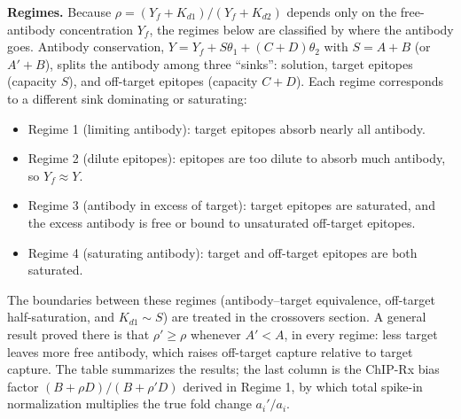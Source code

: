 \documentclass[11pt]{article}
\begin{document}
\textbf{Regimes.} Because $\rho=(Y_f+K_{d1})/(Y_f+K_{d2})$ depends only on
the free-antibody concentration $Y_f$, the regimes below are classified by
where the antibody goes. Antibody conservation,
$Y=Y_f+S\theta_1+(C+D)\theta_2$ with $S=A+B$ (or $A'+B$), splits the
antibody among three ``sinks'': solution, target epitopes (capacity $S$),
and off-target epitopes (capacity $C+D$). Each regime corresponds to a
different sink dominating or saturating:
\begin{itemize}
    \item Regime 1 (limiting antibody): target epitopes absorb nearly all
    antibody.
    \item Regime 2 (dilute epitopes): epitopes are too dilute to absorb
    much antibody, so $Y_f\approx Y$.
    \item Regime 3 (antibody in excess of target): target epitopes are
    saturated, and the excess antibody is free or bound to unsaturated
    off-target epitopes.
    \item Regime 4 (saturating antibody): target and off-target epitopes
    are both saturated.
\end{itemize}
The boundaries between these regimes (antibody--target equivalence,
off-target half-saturation, and $K_{d1}\sim S$) are treated in the
crossovers section. A general result proved there is that
$\rho'\ge\rho$ whenever $A'<A$, in every regime: less target leaves more
free antibody, which raises off-target capture relative to target capture.
The table summarizes the results; the last column is the ChIP-Rx bias
factor $(B+\rho D)/(B+\rho'D)$ derived in Regime 1, by which total
spike-in normalization multiplies the true fold change $a_i'/a_i$.
\end{document}
